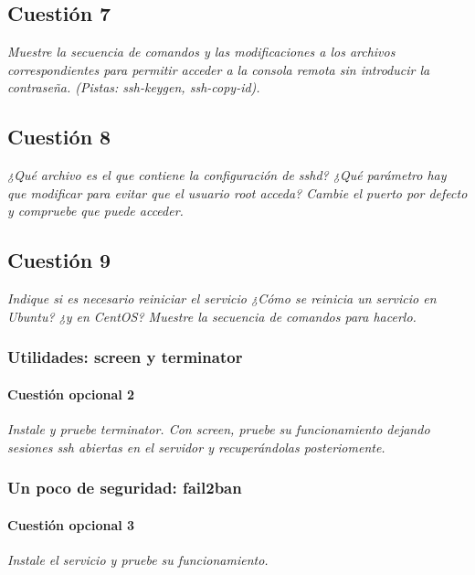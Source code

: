 \subsection{Cuestión 7}
\textit{Muestre la secuencia de comandos y las modificaciones a los archivos correspondientes para permitir acceder a la consola remota sin introducir la contraseña. (Pistas: ssh-keygen, ssh-copy-id).}

\subsection{Cuestión 8}
\textit{¿Qué archivo es el que contiene la configuración de sshd? ¿Qué parámetro hay que modificar para evitar que el usuario root acceda? Cambie el puerto por defecto y compruebe que puede acceder.}

\subsection{Cuestión 9}
\textit{Indique si es necesario reiniciar el servicio ¿Cómo se reinicia un servicio en Ubuntu? ¿y en CentOS? Muestre la secuencia de comandos para hacerlo.}


\subsubsection{Utilidades: screen y terminator}
\paragraph{Cuestión opcional 2}
\textit{Instale y pruebe terminator. Con screen, pruebe su funcionamiento dejando sesiones ssh abiertas en el servidor y recuperándolas posteriomente.}


\subsubsection{Un poco de seguridad: fail2ban}
\paragraph{Cuestión opcional 3}
\textit{Instale el servicio y pruebe su funcionamiento.}


